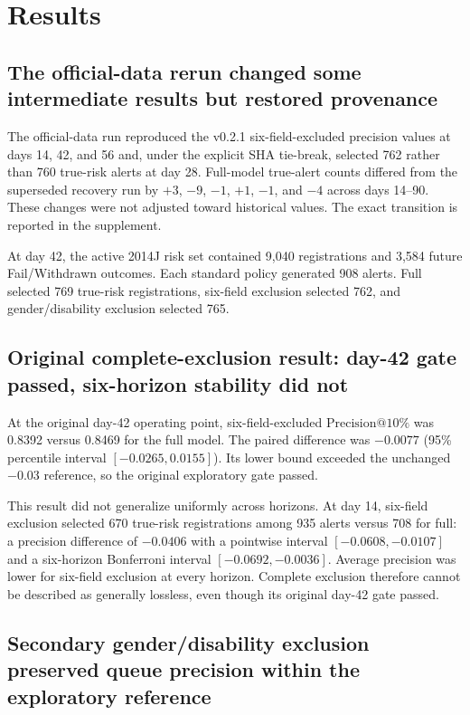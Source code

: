 \documentclass[11pt]{article}
\makeatletter
\newcommand{\Pten}{\ensuremath{\mathrm{Precision}@10\%}}
\makeatother
\begin{document}
\section{Results}

\subsection{The official-data rerun changed some intermediate results but restored provenance}

The official-data run reproduced the v0.2.1 six-field-excluded precision values at days 14, 42, and 56 and, under the explicit SHA tie-break, selected 762 rather than 760 true-risk alerts at day 28. Full-model true-alert counts differed from the superseded recovery run by $+3$, $-9$, $-1$, $+1$, $-1$, and $-4$ across days 14--90. These changes were not adjusted toward historical values. The exact transition is reported in the supplement.

At day 42, the active 2014J risk set contained 9,040 registrations and 3,584 future Fail/Withdrawn outcomes. Each standard policy generated 908 alerts. Full selected 769 true-risk registrations, six-field exclusion selected 762, and gender/disability exclusion selected 765.

\subsection{Original complete-exclusion result: day-42 gate passed, six-horizon stability did not}

At the original day-42 operating point, six-field-excluded \Pten{} was 0.8392 versus 0.8469 for the full model. The paired difference was $-0.0077$ (95\% percentile interval $[-0.0265,0.0155]$). Its lower bound exceeded the unchanged $-0.03$ reference, so the original exploratory gate passed.

This result did not generalize uniformly across horizons. At day 14, six-field exclusion selected 670 true-risk registrations among 935 alerts versus 708 for full: a precision difference of $-0.0406$ with a pointwise interval $[-0.0608,-0.0107]$ and a six-horizon Bonferroni interval $[-0.0692,-0.0036]$. Average precision was lower for six-field exclusion at every horizon. Complete exclusion therefore cannot be described as generally lossless, even though its original day-42 gate passed.

\subsection{Secondary gender/disability exclusion preserved queue precision within the exploratory reference}
\end{document}
